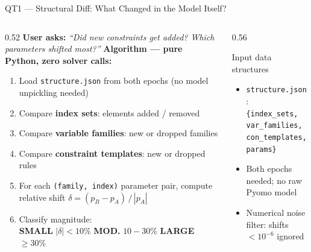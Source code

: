 \documentclass[aspectratio=169,10pt]{beamer}
\begin{document}
\begin{frame}[t]{QT1 — Structural Diff: What Changed in the Model Itself?}
\vspace{2pt}
\begin{columns}[T]
  \begin{column}{0.52\textwidth}
    \small\textbf{User asks:}
    \emph{``Did new constraints get added? Which parameters shifted most?''}
    \vspace{5pt}
    \textbf{Algorithm — pure Python, zero solver calls:}
    \begin{enumerate}\setlength\itemsep{3pt}
      \item Load \texttt{structure.json} from both epochs
            (no model unpickling needed)
      \item Compare \textbf{index sets}: elements added / removed
      \item Compare \textbf{variable families}: new or dropped families
      \item Compare \textbf{constraint templates}: new or dropped rules
      \item For each \texttt{(family, index)} parameter pair, compute
            relative shift $\delta = (p_B - p_A)\,/\,|p_A|$
      \item Classify magnitude:\\
            \textcolor{lgrn}{\textbf{SMALL}} $|\delta|{<}10\%$\quad
            \textcolor{aorng}{\textbf{MOD.}} $10{-}30\%$\quad
            \textcolor{ared}{\textbf{LARGE}} ${\geq}30\%$
    \end{enumerate}
  \end{column}
  \begin{column}{0.56\textwidth}
    \begin{block}{Input data structures}
      \begin{itemize}\setlength\itemsep{1pt}
        \item \texttt{structure.json}:\\
              \texttt{\small \{index\_sets, var\_families,}\\
              \texttt{\small \phantom{x}con\_templates, params\}}
        \item Both epochs needed; no raw Pyomo model
        \item Numerical noise filter: shifts $<\!10^{-6}$ ignored
      \end{itemize}
    \end{block}
    \vspace{5pt}

\end{column}
\end{columns}
\end{frame}
\end{document}
